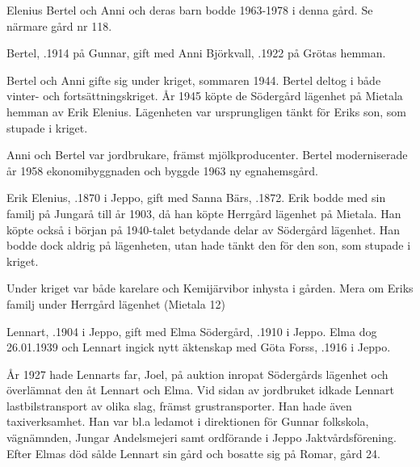 Elenius Bertel och Anni och deras barn bodde 1963-1978 i denna gård. Se närmare gård nr 118.




Bertel, .1914 på Gunnar, gift med Anni Björkvall, .1922 på Grötas hemman.
\begin{jhchildren}
  \item {}
  \item {}
\end{jhchildren}
Bertel och Anni gifte sig under kriget, sommaren 1944. Bertel deltog i både vinter- och fortsättningskriget. År 1945 köpte de Södergård lägenhet på Mietala hemman av Erik Elenius. Lägenheten var ursprungligen tänkt för Eriks son, som stupade i kriget.

Anni och Bertel var jordbrukare, främst mjölkproducenter. Bertel moderniserade år 1958 ekonomibyggnaden och byggde 1963 ny egnahemsgård.


Erik Elenius, .1870 i Jeppo, gift med Sanna Bärs, .1872. Erik bodde med sin familj på Jungarå till år 1903, då han köpte Herrgård lägenhet på Mietala. Han köpte också i början på 1940-talet betydande delar av Södergård lägenhet. Han bodde dock aldrig på lägenheten, utan hade tänkt den för den son, som stupade i kriget.

Under kriget var både karelare och Kemijärvibor inhysta i gården. Mera om Eriks familj under Herrgård lägenhet (Mietala 12)


Lennart, .1904 i Jeppo, gift med Elma Södergård, .1910 i Jeppo. Elma dog 26.01.1939 och Lennart ingick nytt äktenskap med Göta Forss, .1916  i Jeppo.
\begin{jhchildren}
  \item {}
  \item {}
  \item {}
  \item {}
\end{jhchildren}
År 1927 hade Lennarts far, Joel, på auktion inropat Södergårds lägenhet och överlämnat den åt Lennart och Elma. Vid sidan av jordbruket idkade Lennart lastbilstransport av olika slag, främst grustransporter. Han hade även taxiverksamhet. Han var bl.a ledamot i direktionen för Gunnar folkskola, vägnämnden, Jungar Andelsmejeri samt ordförande i Jeppo Jaktvårdsförening. Efter Elmas död sålde Lennart sin gård och bosatte sig på Romar, gård 24.


